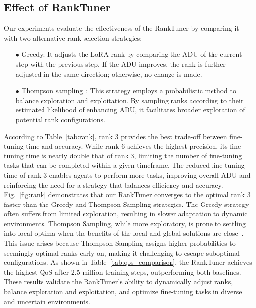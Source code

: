 \subsection{Effect of RankTuner}
Our experiments evaluate the effectiveness of the RankTuner by comparing it with two alternative rank selection strategies:
\begin{itemize}
\item[$\bullet$] 
Greedy: It adjusts the LoRA rank by comparing the ADU of the current step with the previous step. If the ADU improves, the rank is further adjusted in the same direction; otherwise, no change is made.
\end{itemize}
\begin{itemize}
\item[$\bullet$] 
Thompson sampling~\cite{chapelle2011empirical}: This strategy employs a probabilistic method to balance exploration and exploitation. By sampling ranks according to their estimated likelihood of enhancing ADU, it facilitates broader exploration of potential rank configurations.
\end{itemize}
According to Table~\ref{tab:rank}, rank 3 provides the best trade-off between fine-tuning time and accuracy. While rank 6 achieves the highest precision, its fine-tuning time is nearly double that of rank 3, limiting the number of fine-tuning tasks that can be completed within a given timeframe. The reduced fine-tuning time of rank 3 enables agents to perform more tasks, improving overall ADU and reinforcing the need for a strategy that balances efficiency and accuracy. Fig.~\ref{fig:rank} demonstrates that our RankTuner converges to the optimal rank 3 faster than the Greedy and Thompson Sampling strategies. The Greedy strategy often suffers from limited exploration, resulting in slower adaptation to dynamic environments. Thompson Sampling, while more exploratory, is prone to settling into local optima when the benefits of the local and global solutions are close~\cite{phan2019thompson}. This issue arises because Thompson Sampling assigns higher probabilities to seemingly optimal ranks early on, making it challenging to escape suboptimal configurations. As shown in Table~\ref{tab:qos_comparison}, the RankTuner achieves the highest QoS after 2.5 million training steps, outperforming both baselines. These results validate the RankTuner's ability to dynamically adjust ranks, balance exploration and exploitation, and optimize fine-tuning tasks in diverse and uncertain environments.

